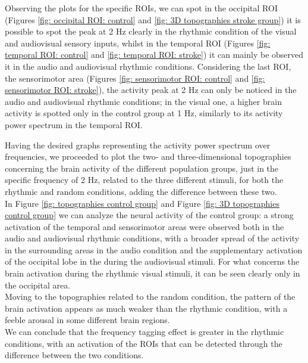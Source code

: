 Observing the plots for the specific ROIs, we can spot in the occipital ROI (Figures \ref{fig: occipital ROI: control} and \ref{fig: 3D topographies stroke group}) it is possible to spot the peak at 2 Hz clearly in the rhythmic condition of the visual and audiovisual sensory inputs, whilst in the temporal ROI (Figures \ref{fig: temporal ROI: control} and \ref{fig: temporal ROI: stroke}) it can mainly be observed it in the audio and audiovisual rhythmic conditions. Considering the last ROI, the sensorimotor area (Figures \ref{fig: sensorimotor ROI: control} and \ref{fig: sensorimotor ROI: stroke}), the activity peak at 2 Hz can only be noticed in the audio and audiovisual rhythmic conditions; in the visual one, a higher brain activity is spotted only in the control group at 1 Hz, similarly to its activity power spectrum in the temporal ROI.

Having the desired graphs representing the activity power spectrum over frequencies, we proceeded to plot the two- and three-dimensional topographies concerning the brain activity of the different population groups, just in the specific frequency of 2 Hz, related to the three different stimuli, for both the rhythmic and random conditions, adding the difference between these two. \\
In Figure \ref{fig: topographies control group} and Figure \ref{fig: 3D topographies control group} we can analyze the neural activity of the control group: a strong activation of the temporal and sensorimotor areas were observed both in the audio and audiovisual rhythmic conditions, with a broader spread of the activity in the surrounding areas in the audio condition and the supplementary activation of the occipital lobe in the during the audiovisual stimuli. For what concerns the brain activation during the rhythmic visual stimuli, it can be seen clearly only in the occipital area. \\
Moving to the topographies related to the random condition, the pattern of the brain activation appears as much weaker than the rhythmic condition, with a feeble arousal in some different brain regions. \\
We can conclude that the frequency tagging effect is greater in the rhythmic conditions, with an activation of the ROIs that can be detected through the difference between the two conditions. 

